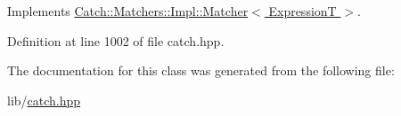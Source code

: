 Implements \hyperlink{struct_catch_1_1_matchers_1_1_impl_1_1_matcher_a091bcc37e589967d7e10fc7790d820e2}{Catch\+::\+Matchers\+::\+Impl\+::\+Matcher$<$ Expression\+T $>$}.



Definition at line 1002 of file catch.\+hpp.



The documentation for this class was generated from the following file\+:\begin{DoxyCompactItemize}
\item 
lib/\hyperlink{catch_8hpp}{catch.\+hpp}\end{DoxyCompactItemize}
